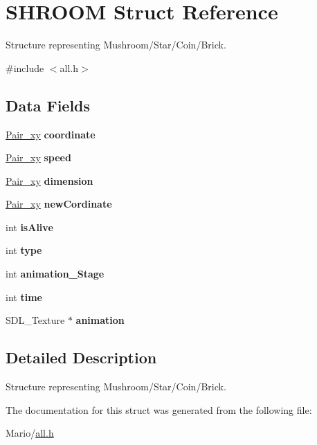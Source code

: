 \hypertarget{struct_s_h_r_o_o_m}{}\section{S\+H\+R\+O\+OM Struct Reference}
\label{struct_s_h_r_o_o_m}


Structure representing Mushroom/\+Star/\+Coin/\+Brick.  




{\ttfamily \#include $<$all.\+h$>$}

\subsection*{Data Fields}
\begin{DoxyCompactItemize}
\item 
\mbox{\label{struct_s_h_r_o_o_m_a6cf77a9254df5cfd669084e0a97d9711}} 
\mbox{\hyperlink{all_8h_a9a35f73dcc6cf9a466e6542847bd8882}{Pair\+\_\+xy}} {\bfseries coordinate}
\item 
\mbox{\label{struct_s_h_r_o_o_m_a17e25b2ef4c597ac58da845ec3bce5c6}} 
\mbox{\hyperlink{all_8h_a9a35f73dcc6cf9a466e6542847bd8882}{Pair\+\_\+xy}} {\bfseries speed}
\item 
\mbox{\label{struct_s_h_r_o_o_m_a0da7d680eb31a67eac3371518ae0a6cb}} 
\mbox{\hyperlink{all_8h_a9a35f73dcc6cf9a466e6542847bd8882}{Pair\+\_\+xy}} {\bfseries dimension}
\item 
\mbox{\label{struct_s_h_r_o_o_m_a566d7fd827e468330cdc3767f674b1ca}} 
\mbox{\hyperlink{all_8h_a9a35f73dcc6cf9a466e6542847bd8882}{Pair\+\_\+xy}} {\bfseries new\+Cordinate}
\item 
\mbox{\label{struct_s_h_r_o_o_m_a116ae74d5b3df6d48cdb0f3a6bb36a07}} 
int {\bfseries is\+Alive}
\item 
\mbox{\label{struct_s_h_r_o_o_m_ac765329451135abec74c45e1897abf26}} 
int {\bfseries type}
\item 
\mbox{\label{struct_s_h_r_o_o_m_a6118bdc05fce34a198c8e8d332708235}} 
int {\bfseries animation\+\_\+\+Stage}
\item 
\mbox{\label{struct_s_h_r_o_o_m_a42715f65f02da52edc5b22021d8ae670}} 
int {\bfseries time}
\item 
\mbox{\label{struct_s_h_r_o_o_m_a15c618ec6bff31ac32dba21208442152}} 
S\+D\+L\+\_\+\+Texture $\ast$ {\bfseries animation}
\end{DoxyCompactItemize}


\subsection{Detailed Description}
Structure representing Mushroom/\+Star/\+Coin/\+Brick. 

The documentation for this struct was generated from the following file\+:\begin{DoxyCompactItemize}
\item 
Mario/\mbox{\hyperlink{all_8h}{all.\+h}}\end{DoxyCompactItemize}
